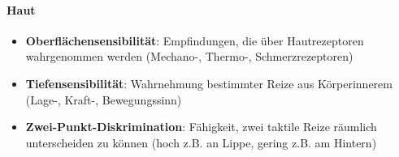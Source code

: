 \paragraph{Haut}
\begin{itemize}
  \item \textbf{Oberflächensensibilität}: Empfindungen, die über Hautrezeptoren wahrgenommen werden (Mechano-, Thermo-, Schmerzrezeptoren)
  \item \textbf{Tiefensensibilität}: Wahrnehmung bestimmter Reize aus Körperinnerem (Lage-, Kraft-, Bewegungssinn)
  \item \textbf{Zwei-Punkt-Diskrimination}: Fähigkeit, zwei taktile Reize räumlich unterscheiden zu können (hoch z.B. an Lippe, gering z.B. am Hintern)
\end{itemize}